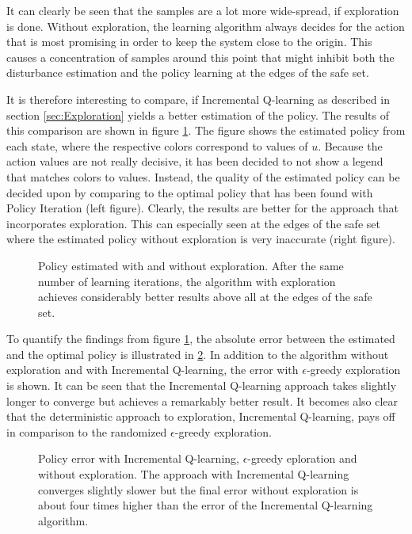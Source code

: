 \documentclass[../main.tex]{subfiles}
\begin{document}
It can clearly be seen that the samples are a lot more wide-spread, if exploration is done. Without exploration, the learning algorithm always decides for the action that is most promising in order to keep the system close to the origin. This causes a concentration of samples around this point that might inhibit both the disturbance estimation and the policy learning at the edges of the safe set. 

It is therefore interesting to compare, if Incremental Q-learning as described in section \ref{sec:Exploration} yields a better estimation of the policy. The results of this comparison are shown in figure \ref{fig:policy_exploration}. The figure shows the estimated policy from each state, where the respective colors correspond to values of $u$. Because the action values are not really decisive, it has been decided to not show a legend that matches colors to values. Instead, the quality of the estimated policy can be decided upon by comparing to the optimal policy that has been found with Policy Iteration (left figure). Clearly, the results are better for the approach that incorporates exploration. This can especially seen at the edges of the safe set where the estimated policy without exploration is very inaccurate (right figure).

\begin{figure}
    \centering
    \caption{Policy estimated with and without exploration. After the same number of learning iterations, the algorithm with exploration achieves considerably better results above all at the edges of the safe set.} \label{fig:policy_exploration}
\end{figure}

To quantify the findings from figure \ref{fig:policy_exploration}, the absolute error between the estimated and the optimal policy is illustrated in \ref{fig:PolicyError}. In addition to the algorithm without exploration and with Incremental Q-learning, the error with $\epsilon$-greedy exploration is shown. It can be seen that the Incremental Q-learning approach takes slightly longer to converge but achieves a remarkably better result. It becomes also clear that the deterministic approach to exploration, Incremental Q-learning, pays off in comparison to the randomized $\epsilon$-greedy exploration. 

\begin{figure}[h]
    \centering
    \caption{Policy error with Incremental Q-learning, $\epsilon$-greedy eploration and without exploration. The approach with Incremental Q-learning converges slightly slower but the final error without exploration is about four times higher than the error of the Incremental Q-learning algorithm.} \label{fig:PolicyError}
\end{figure}
\end{document}
